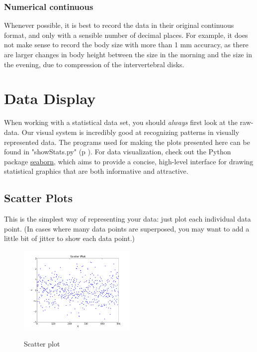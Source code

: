 \subsubsection{Numerical continuous}
Whenever possible, it is best to record the data in their original continuous format, and only with a sensible number of decimal places. For example, it does not make sense to record the body size with more than 1 mm accuracy, as there are larger changes in body height between the size in the morning and the size in the evening, due to compression of the intervertebral disks.

\section{Data Display}

When working with a statistical data set, you should \emph{always} first look at the raw-data. Our visual system is incredibly good at recognizing patterns in visually represented data. The programs used for making the plots presented here can be found in "showStats.py" (p \pageref{py:showStats}). For data visualization, check out the Python package \href{http://www.stanford.edu/~mwaskom/software/seaborn/} {seaborn}, which aims to provide a concise, high-level interface for drawing statistical graphics that are both informative and attractive.

\subsection{Scatter Plots}

This is the simplest way of representing your data: just plot each individual data point. (In cases where many data points are superposed, you may want to add a little bit of jitter to show each data point.)

\begin{figure}[h]
  \centering
  \includegraphics[width=0.5\textwidth]{../Images/scatterPlot.png}\\
  \caption{Scatter plot}
\end{figure}

